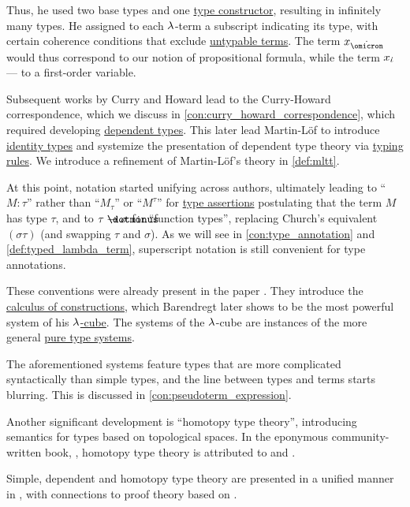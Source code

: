 \begin{remark}
  Thus, he used two base types and one \hyperref[con:type_constructor]{type constructor}, resulting in infinitely many types. He assigned to each \( {\mathrm \lambda} \)-term a subscript indicating its type, with certain coherence conditions that exclude \hyperref[def:typability]{untypable terms}. The term \( x_{\syn\omicron} \) would thus correspond to our notion of propositional formula, while the term \( x_{\dot{\iota}} \) --- to a first-order variable.

  Subsequent works by Curry and Howard lead to the Curry-Howard correspondence, which we discuss in \cref{con:curry_howard_correspondence}, which required developing \hyperref[con:dependent_type]{dependent types}. This later lead Martin-Löf to introduce \hyperref[def:identity_type]{identity types} and systemize the presentation of dependent type theory via \hyperref[con:typing_rule]{typing rules}. We introduce a refinement of Martin-L\"of's theory in \cref{def:mltt}.

  At this point, notation started unifying across authors, ultimately leading to \enquote{\( M: \tau \)} rather than \enquote{\( M_\tau \)} or \enquote{\( M^\tau \)} for \hyperref[def:type_assertion]{type assertions} postulating that the term \( M \) has type \( \tau \), and to \( \tau \synimplies \sigma \) for \enquote{function types}, replacing Church's equivalent \( (\sigma\tau) \) (and swapping \( \tau \) and \( \sigma \)). As we will see in \cref{con:type_annotation} and \cref{def:typed_lambda_term}, superscript notation is still convenient for type annotations.

  These conventions were already present in the paper . They introduce the \hyperref[def:lambda_cube/combinations]{calculus of constructions}, which Barendregt later shows to be the most powerful system of his \hyperref[def:lambda_cube]{\( {\mathrm \lambda} \)-cube}. The systems of the \( {\mathrm \lambda} \)-cube are instances of the more general \hyperref[def:pure_type_system]{pure type systems}.

  The aforementioned systems feature types that are more complicated syntactically than simple types, and the line between types and terms starts blurring. This is discussed in \cref{con:pseudoterm_expression}.

  Another significant development is \enquote{homotopy type theory}, introducing semantics for types based on topological spaces. In the eponymous community-written book, \cite{UnivalentFoundationsProgram2013HoTT}, homotopy type theory is attributed to \cite{Voevodski2006HoTT} and \cite{AwodeyWarren2009HoTT}.
\end{remark}
\begin{comments}
  \item Simple, dependent and homotopy type theory are presented in a unified manner in \cite{Mimram2020ProgramEqualsProof}, with connections to proof theory based on .
\end{comments}

